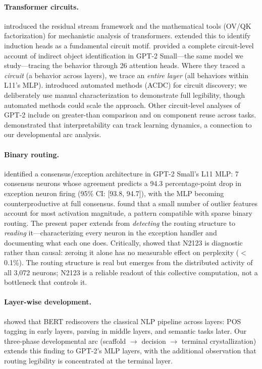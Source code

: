 \documentclass{article}
\begin{document}
\paragraph{Transformer circuits.}
\citet{elhage2021mathematical} introduced the residual stream framework and
the mathematical tools (OV/QK factorization) for mechanistic analysis of
transformers. \citet{olsson2022context} extended this to identify induction
heads as a fundamental circuit motif.
\citet{wang2023interpretability} provided a complete circuit-level account
of indirect object identification in GPT-2 Small---the same model we study---tracing
the behavior through 26 attention heads. Where they traced a \emph{circuit}
(a behavior across layers), we trace an \emph{entire layer} (all behaviors
within L11's MLP).
\citet{conmy2023automated} introduced automated methods (ACDC) for circuit
discovery; we deliberately use manual characterization to demonstrate full
legibility, though automated methods could scale the approach.
Other circuit-level analyses of GPT-2 include \citet{hanna2024does} on
greater-than comparison and \citet{merullo2024circuit} on component reuse
across tasks.
\citet{nanda2023progress} demonstrated that interpretability can track
learning dynamics, a connection to our developmental arc analysis.

\paragraph{Binary routing.}
\citet{balogh2026discrete} identified a consensus/exception architecture in
GPT-2 Small's L11 MLP: 7 consensus neurons whose agreement predicts a 94.3
percentage-point drop in exception neuron firing (95\% CI: [93.8, 94.7]),
with the MLP becoming counterproductive at full consensus.
\citet{dettmers2022llm} found that a small number of outlier features account for
most activation magnitude, a pattern compatible with sparse binary routing.
The present paper extends \citet{balogh2026discrete} from \emph{detecting} the
routing structure to \emph{reading} it---characterizing every neuron in the
exception handler and documenting what each one does.
Critically, \citet{balogh2026discrete} showed that N2123 is diagnostic rather
than causal: zeroing it alone has no measurable effect on perplexity ($<$0.1\%).
The routing structure is real but emerges from the distributed activity of all
3,072 neurons; N2123 is a reliable readout of this collective computation,
not a bottleneck that controls it.

\paragraph{Layer-wise development.}
\citet{tenney2019bert} showed that BERT rediscovers the classical NLP pipeline
across layers: POS tagging in early layers, parsing in middle layers, and
semantic tasks later. Our three-phase developmental arc (scaffold $\to$
decision $\to$ terminal crystallization) extends this finding to GPT-2's
MLP layers, with the additional observation that routing legibility is
concentrated at the terminal layer.
\end{document}
